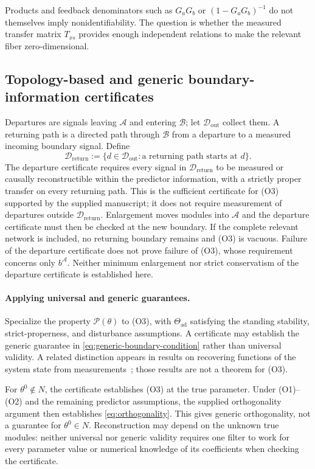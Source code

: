 \documentclass[11pt,a4paper]{article}
\newcommand{\Aset}{\mathcal A}
\begin{document}
Products and feedback denominators such as $G_aG_b$ or $(1-G_aG_b)^{-1}$ do not themselves imply nonidentifiability.  The question is whether the measured transfer matrix $T_{xs}$ provides enough independent relations to make the relevant fiber zero-dimensional.

\subsection{Topology-based and generic boundary-information certificates}
\label{sec:generic-boundary-certificate}

Departures are signals leaving $\Aset$ and entering $\mathcal B$; let $\mathcal D_{\mathrm{out}}$ collect them.  A returning path is a directed path through $\mathcal B$ from a departure to a measured incoming boundary signal.  Define
\[
  \mathcal D_{\mathrm{return}}
  :=\{d\in\mathcal D_{\mathrm{out}}:\text{a returning path starts at }d\}.
\]
The departure certificate requires every signal in $\mathcal D_{\mathrm{return}}$ to be measured or causally reconstructible within the predictor information, with a strictly proper transfer on every returning path.  This is the sufficient certificate for (O3) supported by the supplied manuscript; it does not require measurement of departures outside $\mathcal D_{\mathrm{return}}$.  Enlargement moves modules into $\Aset$ and the departure certificate must then be checked at the new boundary.  If the complete relevant network is included, no returning boundary remains and (O3) is vacuous.  Failure of the departure certificate does not prove failure of (O3), whose requirement concerns only $b^{\Aset}$.  Neither minimum enlargement nor strict conservatism of the departure certificate is established here.

\paragraph{Applying universal and generic guarantees.}
Specialize the property $\mathcal P(\theta)$ to (O3), with $\Theta_{\mathrm{ad}}$ satisfying the standing stability, strict-properness, and disturbance assumptions.  A certificate may establish the generic guarantee in \eqref{eq:generic-boundary-condition} rather than universal validity.  A related distinction appears in results on recovering functions of the system state from measurements~\cite{ZhangFernandoDarouachSFO}; those results are not a theorem for (O3).

For $\theta^0\notin N$, the certificate establishes (O3) at the true parameter.  Under (O1)--(O2) and the remaining predictor assumptions, the supplied orthogonality argument then establishes \eqref{eq:orthogonality}.  This gives generic orthogonality, not a guarantee for $\theta^0\in N$.  Reconstruction may depend on the unknown true modules: neither universal nor generic validity requires one filter to work for every parameter value or numerical knowledge of its coefficients when checking the certificate.
\end{document}

